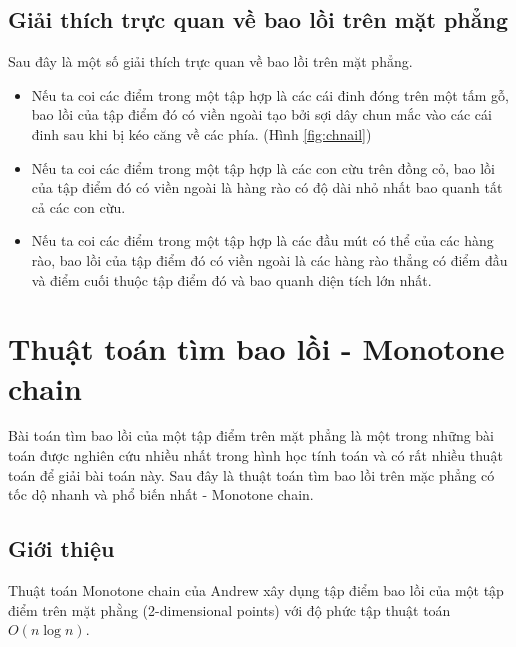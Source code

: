 \documentclass[12pt]{article}
\begin{document}
      \subsection{Giải thích trực quan về bao lồi trên mặt phẳng}
        Sau đây là một số giải thích trực quan về bao lồi trên mặt phẳng. 
        \begin{itemize}
          \item Nếu ta coi các điểm trong một tập hợp là các cái đinh đóng trên một tấm gỗ, bao lồi của tập điểm đó có viền ngoài tạo bởi sợi dây chun mắc vào các cái đinh sau khi bị kéo căng về các phía. (Hình \ref{fig:chnail})
          \item Nếu ta coi các điểm trong một tập hợp là các con cừu trên đồng cỏ, bao lồi của tập điểm đó có viền ngoài là hàng rào có độ dài nhỏ nhất bao quanh tất cả các con cừu.
          \item Nếu ta coi các điểm trong một tập hợp là các đầu mút có thể của các hàng rào, bao lồi của tập điểm đó có viền ngoài là các hàng rào thẳng có điểm đầu và điểm cuối thuộc tập điểm đó và bao quanh diện tích lớn nhất.
        \end{itemize}
    \section{Thuật toán tìm bao lồi - Monotone chain}
      Bài toán tìm bao lồi của một tập điểm trên mặt phẳng là một trong những bài toán được nghiên cứu nhiều nhất trong hình học tính toán và có rất nhiều thuật toán để giải bài toán này. Sau đây là thuật toán tìm bao lồi trên mặc phẳng có tốc dộ nhanh và phổ biến nhất - Monotone chain.
      \subsection{Giới thiệu}
        Thuật toán Monotone chain của Andrew xây dụng tập điểm bao lồi của một tập điểm trên mặt phằng (2-dimensional points) với độ phức tập thuật toán $O(n\log n)$.
\end{document}
